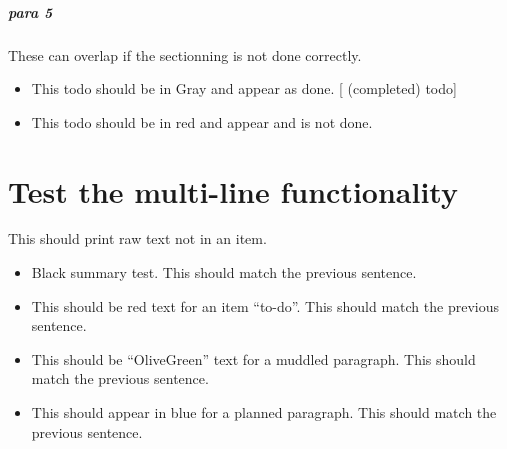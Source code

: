 \paragraph{para 5}
\label{autosec:7}
These can overlap if the sectionning is not done correctly.
    \begin{itemize}[noitemsep]
        \item {\color{Gray}This todo should be in Gray and appear as done. [ (completed) todo]}
        \item {\color{red}This todo should be in red and appear and is not done.}
    \end{itemize}
\chapter{Test the multi-line functionality}
\label{autosec:7}
This should print raw text not in an item.
    \begin{itemize}[noitemsep]
        \item Black summary test.
This should match the previous sentence.
        \item {\color{red}This should be red text for an item ``to-do''.}
{\color{red}This should match the previous sentence.}
        \item {\color{OliveGreen}This should be ``OliveGreen'' text for a muddled paragraph.}
{\color{OliveGreen}This should match the previous sentence.}
        \item {\color{blue}This should appear in blue for a planned paragraph.}
{\color{blue}This should match the previous sentence.}
    \end{itemize}
